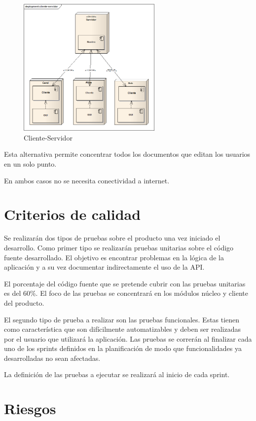 \documentclass[12pt,a4paper]{article}
\begin{document}
	\begin{figure}[!ht]
		\begin{center}
			\includegraphics[width=7cm]{cliente-servidor.png}
			\caption{\label{server-client} Cliente-Servidor }
		\end{center}
	\end{figure}

Esta alternativa permite concentrar todos los documentos que editan los usuarios en un solo punto.

En ambos casos no se necesita conectividad a internet.	

	\section{Criterios de calidad}
	
Se realizarán dos tipos de pruebas sobre el producto una vez iniciado el desarrollo. Como primer tipo se realizarán pruebas unitarias sobre el código fuente desarrollado. El objetivo es encontrar problemas en la lógica de la aplicación y a su vez documentar indirectamente el uso de la API.

	El porcentaje del código fuente que se pretende cubrir con las pruebas unitarias es del 60\%. El foco de las pruebas se concentrará en los módulos núcleo y cliente del producto.

	El segundo tipo de prueba a realizar son las pruebas funcionales. Estas tienen como característica que son difícilmente automatizables y deben ser realizadas por el usuario que utilizará la aplicación. Las pruebas se correrán al finalizar cada uno de los sprints definidos en la planificación de modo que funcionalidades ya desarrolladas no sean afectadas.

La definición de las pruebas a ejecutar se realizará al inicio de cada sprint.

	\section{Riesgos}
\end{document}
